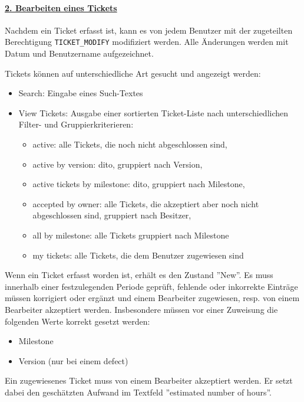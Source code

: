 \paragraph{\underline{2. Bearbeiten eines Tickets}}
Nachdem ein Ticket erfasst ist, kann es von jedem Benutzer mit der zugeteilten
Berechtigung \verb+TICKET_MODIFY+ modifiziert werden. Alle Änderungen
werden mit Datum und Benutzername aufgezeichnet.

Tickets können auf unterschiedliche Art gesucht und angezeigt werden:
\begin{itemize}
\item Search: Eingabe eines Such-Textes
\item View Tickets: Ausgabe einer sortierten Ticket-Liste nach unterschiedlichen
  Filter- und Gruppierkriterieren:
  \begin{itemize}
  \item active: alle Tickets, die noch nicht abgeschlossen sind,
  \item active by version: dito, gruppiert nach Version,
  \item active tickets by milestone: dito, gruppiert nach Milestone,
  \item accepted by owner: alle Tickets, die akzeptiert aber noch
    nicht abgeschlossen sind, gruppiert nach Besitzer,
  \item all by milestone: alle Tickets gruppiert nach Milestone
  \item my tickets: alle Tickets, die dem Benutzer zugewiesen sind
  \end{itemize}
\end{itemize}
\newslide
Wenn ein Ticket erfasst worden ist, erhält es den Zustand ''New''. Es
muss innerhalb einer festzulegenden Periode geprüft, fehlende oder
inkorrekte Einträge müssen korrigiert oder ergänzt und einem
Bearbeiter zugewiesen, resp. von einem Bearbeiter akzeptiert
werden. Insbesondere müssen vor einer Zuweisung die folgenden Werte
korrekt gesetzt werden:
\begin{itemize}
  \item Milestone
  \item Version (nur bei einem defect)
\end{itemize}
Ein zugewiesenes Ticket muss von einem Bearbeiter akzeptiert
werden. Er setzt dabei den geschätzten Aufwand im Textfeld ''estimated
number of hours''.
%
\newslide
